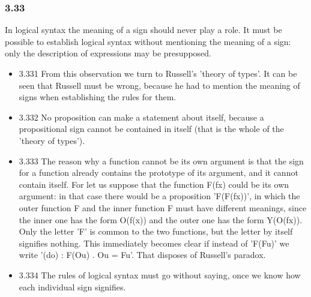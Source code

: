 \documentclass[11pt]{article}
\begin{document}
\subsubsection*{3.33}
\label{sec:orgd2ca939}
In logical syntax the meaning of a sign should never play a role. It
must be possible to establish logical syntax without mentioning the meaning
of a sign: only the description of expressions may be presupposed.
\begin{itemize}
\item 3.331
\label{sec:org4b719d5}
From this observation we turn to Russell's 'theory of types'. It can
be seen that Russell must be wrong, because he had to mention the meaning
of signs when establishing the rules for them.
\item 3.332
\label{sec:orgd3caf7b}
No proposition can make a statement about itself, because a
propositional sign cannot be contained in itself (that is the whole of the
'theory of types').
\item 3.333
\label{sec:org80279d4}
The reason why a function cannot be its own argument is that the sign
for a function already contains the prototype of its argument, and it
cannot contain itself. For let us suppose that the function F(fx) could be
its own argument: in that case there would be a proposition 'F(F(fx))', in
which the outer function F and the inner function F must have different
meanings, since the inner one has the form O(f(x)) and the outer one has
the form Y(O(fx)). Only the letter 'F' is common to the two functions, but
the letter by itself signifies nothing. This immediately becomes clear if
instead of 'F(Fu)' we write '(do) : F(Ou) . Ou = Fu'. That disposes of
Russell's paradox.
\item 3.334
\label{sec:org7860a3a}
The rules of logical syntax must go without saying, once we know how
each individual sign signifies.
\end{itemize}
\end{document}
